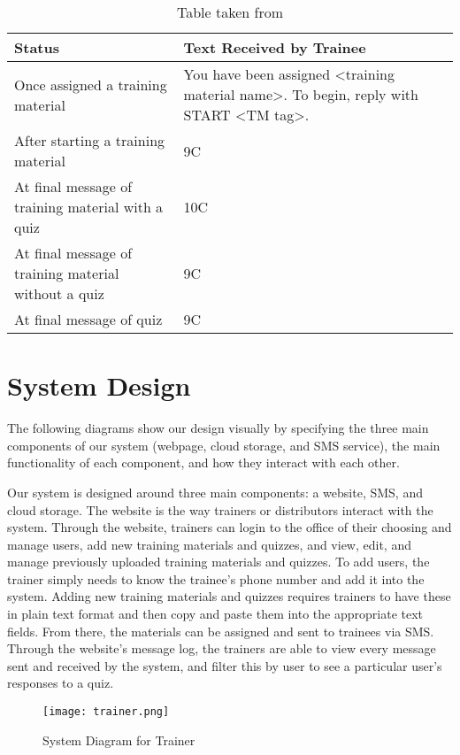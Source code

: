 \begin{table}[H]

    \begin{tabular}{ | p{5cm} | p{7cm} |}
    \hline
    \textbf{Status} & \textbf{Text Received by Trainee} \\ \hline
    Once assigned a training material & You have been assigned <training material name>. To begin, reply with START <TM tag>.  \\ \hline
    After starting a training material & 9C  \\ \hline
    At final message of training material with a quiz & 10C \\ \hline
    At final message of training material without a quiz & 9C  \\ \hline
    At final message of quiz & 9C  \\ \hline
	\end{tabular}
	\caption{Table taken from}
\end{table}
	

\section{System Design}
The following diagrams show our design visually by specifying the three main components of our system (webpage, cloud storage, and SMS service), the main functionality of each component, and how they interact with each other.

Our system is designed around three main components: a website, SMS, and cloud storage. The website is the way trainers or distributors interact with the system. Through the website, trainers can login to the office of their choosing and manage users, add new training materials and quizzes, and view, edit, and manage previously uploaded training materials and quizzes. To add users, the trainer simply needs to know the trainee's phone number and add it into the system. Adding new training materials and quizzes requires trainers to have these in plain text format and then copy and paste them into the appropriate text fields. From there, the materials can be assigned and sent to trainees via SMS. Through the website's message log, the trainers are able to view every message sent and received by the system, and filter this by user to see a particular user's responses to a quiz.

\begin{figure}[H]
	\centering
	\texttt{[image: trainer.png]}
	\caption{System Diagram for Trainer}
\end{figure}


